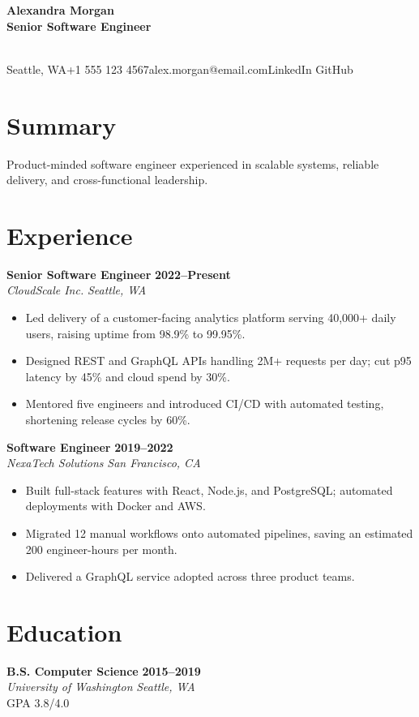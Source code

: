 \documentclass[10pt,letterpaper]{article}
\begin{document}
\noindent\colorbox{accent}{\parbox{\dimexpr\linewidth-2\fboxsep\relax}{\color{white}\fontsize{24}{28}\selectfont\bfseries Alexandra Morgan\\[1pt]\normalsize Senior Software Engineer}}\\[7pt]
\small Seattle, WA\textbar{}+1 555 123 4567\textbar{}alex.morgan@email.com\textbar{}LinkedIn \textbar{} GitHub

\section{Summary}
\noindent Product-minded software engineer experienced in scalable systems, reliable delivery, and cross-functional leadership.

\section{Experience}
\noindent\textbf{Senior Software Engineer} \hfill \textbf{2022--Present}\\
\textit{CloudScale Inc.} \hfill \textit{Seattle, WA}\\[2pt]
\begin{itemize}
\item Led delivery of a customer-facing analytics platform serving 40,000+ daily users, raising uptime from 98.9\% to 99.95\%.
\item Designed REST and GraphQL APIs handling 2M+ requests per day; cut p95 latency by 45\% and cloud spend by 30\%.
\item Mentored five engineers and introduced CI/CD with automated testing, shortening release cycles by 60\%.
\end{itemize}
\vspace{5pt}
\noindent\textbf{Software Engineer} \hfill \textbf{2019--2022}\\
\textit{NexaTech Solutions} \hfill \textit{San Francisco, CA}\\[2pt]
\begin{itemize}
\item Built full-stack features with React, Node.js, and PostgreSQL; automated deployments with Docker and AWS.
\item Migrated 12 manual workflows onto automated pipelines, saving an estimated 200 engineer-hours per month.
\item Delivered a GraphQL service adopted across three product teams.
\end{itemize}
\vspace{5pt}
\section{Education}
\noindent\textbf{B.S. Computer Science} \hfill \textbf{2015--2019}\\
\textit{University of Washington} \hfill \textit{Seattle, WA}\\[2pt]
{\small GPA 3.8/4.0}
\end{document}
